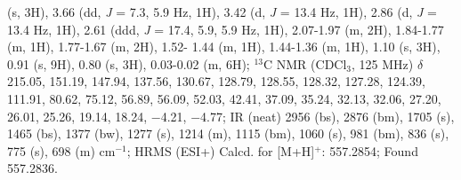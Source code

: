 (s, 3H), 3.66 (dd, \textit{J} = 7.3, 5.9 Hz, 1H), 3.42 (d, \textit{J} = 13.4 Hz, 1H), 2.86 (d, \textit{J} = 13.4 Hz, 1H), 2.61
(ddd, \textit{J} = 17.4, 5.9, 5.9 Hz, 1H), 2.07-1.97 (m, 2H), 1.84-1.77 (m, 1H), 1.77-1.67 (m, 2H), 1.52-
1.44 (m, 1H), 1.44-1.36 (m, 1H), 1.10 (s, 3H), 0.91 (s, 9H), 0.80 (s, 3H), 0.03-0.02 (m, 6H); $^{13}$C
NMR (CDCl$_3$, 125 MHz) $\delta$ 215.05, 151.19, 147.94, 137.56, 130.67, 128.79, 128.55, 128.32,
127.28, 124.39, 111.91, 80.62, 75.12, 56.89, 56.09, 52.03, 42.41, 37.09, 35.24, 32.13, 32.06,
27.20, 26.01, 25.26, 19.14, 18.24, $-$4.21, $-$4.77; IR (neat) 2956 (bs), 2876 (bm), 1705 (s), 1465
(bs), 1377 (bw), 1277 (s), 1214 (m), 1115 (bm), 1060 (s), 981 (bm), 836 (s), 775 (s), 698 (m)
cm$^{-1}$; HRMS (ESI+) Calcd. for  [M+H]$^+$: 557.2854; Found 557.2836.


